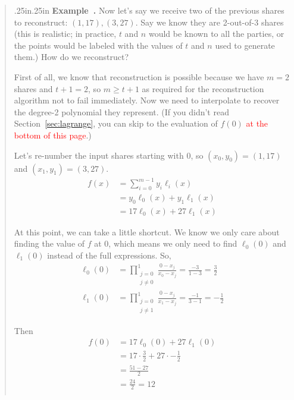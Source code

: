 \documentclass[12 pt]{article}
\newcommand{\todo}[1]{\textcolor{red}{#1}}
\newcounter{example}[section]
\newenvironment{example}{\refstepcounter{example}\par\bigskip \begin{quotation}{}{\leftmargin .25in\rightmargin .25in}
    \noindent \textbf{Example~\thesection.\theexample }  \rmfamily}{\end{quotation}\par\bigskip}
\begin{document}
\begin{example}
    Now let's say we receive two of the previous shares to reconstruct:
    $(1,17),(3,27)$. Say we know they are 2-out-of-3 shares (this is realistic; 
    in practice, $t$ and $n$ would be known to all the parties, or the 
    points would be labeled with the values of $t$ and $n$ used to 
    generate them.) How do we reconstruct?

    First of all, we know that reconstruction is possible because 
    we have $m=2$ shares and $t+1=2$, so $m \geq t+1$ as required for the 
    reconstruction algorithm not to fail immediately.
    Now we need to interpolate to recover the degree-2 polynomial 
    they represent. (If you didn't read Section~\ref{sec:lagrange}, 
    you can skip to the evaluation of $f(0)$ \todo{at the bottom of this page}.)

    Let's re-number the input shares starting with 
    0, so $(x_0,y_0) = (1,17)$ and $(x_1,y_1) = (3,27)$.
    \begin{align*}
        f(x) &= \sum_{i=0}^{m-1} y_i \ell_i(x)\\
        &= y_0 \ell_0(x) + y_1 \ell_1(x)\\
        &= 17 \ell_0(x) + 27 \ell_1(x)
    \end{align*}

    At this point, we can take a little shortcut. We know we only 
    care about finding the value of $f$ at 0, which means we only 
    need to find $\ell_0(0)$ and $\ell_1(0)$ instead of the full 
    expressions. So,
    \begin{align*}
        \ell_0(0) &= \prod_{\substack{j=0\\j\neq 0}}^{1} \frac{0-x_j}{x_0-x_j}
        = \frac{-3}{1-3}
        = \frac{3}{2}\\
        \ell_1(0) &= \prod_{\substack{j=0\\j\neq 1}}^{1} \frac{0-x_j}{x_1-x_j}
        = \frac{-1}{3-1}
        = -\frac{1}{2}
    \end{align*}

    Then 
    \begin{align*}
        f(0) &= 17 \ell_0(0) + 27 \ell_1(0)\\
        &= 17 \cdot \frac{3}{2} + 27 \cdot -\frac{1}{2}\\
        &= \frac{51-27}{2}\\
        &= \frac{24}{2} = 12\\
    \end{align*}
\end{example}
\end{document}
